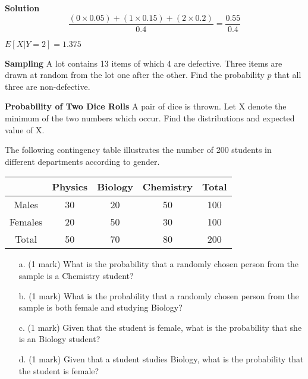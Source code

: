 \begin{framed}
\textbf{Solution}
\[   \frac{(0 \times 0.05) + (1 \times 0.15)+(2 \times 0.2) }{0.4}  = \frac{0.55}{0.4}  \] 

$E[X|Y=2] = 1.375$
\end{framed}


\item \textbf{Sampling}
A lot contains 13 items of which 4 are defective. Three items are drawn at random from the lot one after the other. Find the probability $p$ that all three are non-defective.



\item \textbf{Probability of Two Dice Rolls}
A pair of dice is thrown. Let X denote the minimum of the two numbers which occur.
Find the distributions and expected value of X.

\item The following contingency table illustrates the number of 200 students in different
departments according to gender.

\begin{center}
\begin{tabular}{|c|c|c|c|c|}
\hline
& Physics & Biology & Chemistry & Total \\\hline
Males & 30 & 20 & 50 & 100 \\  \hline
Females & 20 & 50 & 30 & 100 \\ \hline
Total & 50 & 70 & 80 & 200 \\
\hline
\end{tabular}
\end{center}

\begin{itemize}
\item[a.] (1 mark) What is the probability that a randomly chosen person from the sample is a
Chemistry student?
\item[b.] (1 mark) What is the probability that a randomly chosen person from the sample is both female and studying Biology?
\item[c.] (1 mark) Given that the student is female, what is the probability that she is an
Biology student?
\item[d.] (1 mark) Given that a student studies Biology, what is the probability that the student is female?
\end{itemize}
